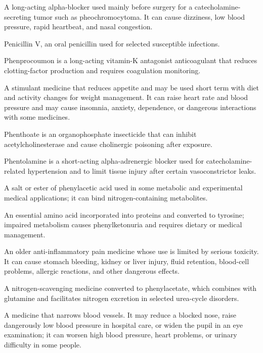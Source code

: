  A long-acting alpha-blocker used mainly before surgery for a catecholamine-secreting tumor such as pheochromocytoma. It can cause dizziness, low blood pressure, rapid heartbeat, and nasal congestion.

 Penicillin V, an oral penicillin used for selected susceptible infections.

 Phenprocoumon is a long-acting vitamin-K antagonist anticoagulant that reduces clotting-factor production and requires coagulation monitoring.

 A stimulant medicine that reduces appetite and may be used short term with diet and activity changes for weight management. It can raise heart rate and blood pressure and may cause insomnia, anxiety, dependence, or dangerous interactions with some medicines.

 Phenthoate is an organophosphate insecticide that can inhibit acetylcholinesterase and cause cholinergic poisoning after exposure.

 Phentolamine is a short-acting alpha-adrenergic blocker used for catecholamine-related hypertension and to limit tissue injury after certain vasoconstrictor leaks.

 A salt or ester of phenylacetic acid used in some metabolic and experimental medical applications; it can bind nitrogen-containing metabolites.

 An essential amino acid incorporated into proteins and converted to tyrosine; impaired metabolism causes phenylketonuria and requires dietary or medical management.

 An older anti-inflammatory pain medicine whose use is limited by serious toxicity. It can cause stomach bleeding, kidney or liver injury, fluid retention, blood-cell problems, allergic reactions, and other dangerous effects.

 A nitrogen-scavenging medicine converted to phenylacetate, which combines with glutamine and facilitates nitrogen excretion in selected urea-cycle disorders.

 A medicine that narrows blood vessels. It may reduce a blocked nose, raise dangerously low blood pressure in hospital care, or widen the pupil in an eye examination; it can worsen high blood pressure, heart problems, or urinary difficulty in some people.

